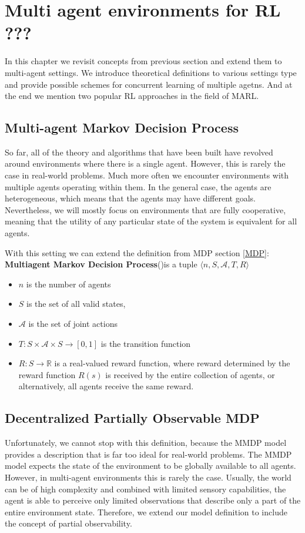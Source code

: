 \chapter{Multi agent environments for RL ???}

In this chapter we revisit concepts from previous section and extend them to multi-agent settings.
We introduce theoretical definitions to various settings type and provide possible schemes for concurrent learning of multiple agetns.
And at the end we mention two popular RL approaches in the field of MARL. 

\section{Multi-agent Markov Decision Process}
So far, all of the theory and algorithms that have been built have revolved around environments where there is a single agent.
However, this is rarely the case in real-world problems.
Much more often we encounter environments with multiple agents operating within them.
In the general case, the agents are heterogeneous, which means that the agents may have different goals.
Nevertheless, we will mostly focus on environments that are fully cooperative, meaning that the utility of any particular state of the system is equivalent for all agents.

With this setting we can extend the definition from MDP section \ref{MDP}:
\linebreak
\textbf{Multiagent Markov Decision Process}(\cite{MMDP})is a tuple 
$\langle n, S, \mathcal{A}, T, R\rangle$
\begin{itemize}
    \item $n$ is the number of agents
    \item $S$ is the set of all valid states,
    \item $\mathcal{A} $ is the set of joint actions
    \item $T: S \times \mathcal{A} \times S \rightarrow [0,1]$ is the transition function
    \item $R: S  \rightarrow \mathbb{R}$ is a real-valued reward function, where reward determined by the reward function $R(s)$ is received by the entire collection of agents, or alternatively, all agents receive the same reward.

\end{itemize}

\section{Decentralized Partially Observable MDP}
Unfortunately, we cannot stop with this definition, because the MMDP model provides a description that is far too ideal for real-world problems.
The MMDP model expects the state of the environment to be globally available to all agents.
However, in multi-agent environments this is rarely the case.
Usually, the world can be of high complexity and combined with limited sensory capabilities, the agent is able to perceive only limited observations that describe only a part of the entire environment state.
Therefore, we extend our model definition to include the concept of partial observability.

